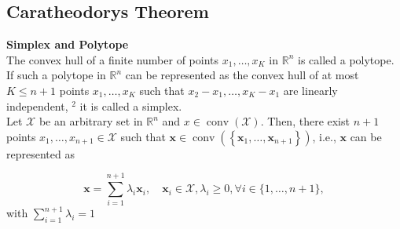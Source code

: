 \documentclass[english]{latex4ei_sheet}
\begin{document}
\begin{sectionbox}
\subsection{Caratheodorys Theorem}

\textbf{Simplex and Polytope}\\
The convex hull of a finite number of points $x_{1}, \ldots, x_{K}$ in $\mathbb{R}^{n}$ is called a polytope. If such a polytope in $\mathbb{R}^{n}$ can be represented as the convex hull of at most $K \leq n+1$ points $x_{1}, \ldots, x_{K}$ such that $x_{2}-x_{1}, \ldots, x_{K}-x_{1}$ are linearly independent, $^{2}$ it is called a simplex.\\

Let $\mathcal{X}$ be an arbitrary set in $\mathbb{R}^{n}$ and $x \in \operatorname{conv}(\mathcal{X})$. Then, there exist $n+1$ points $x_{1}, \ldots, x_{n+1} \in \mathcal{X}$ such that $\boldsymbol{x} \in \operatorname{conv}\left(\left\{\boldsymbol{x}_{1}, \ldots, \boldsymbol{x}_{n+1}\right\}\right)$, i.e., $\boldsymbol{x}$ can be represented as
\begin{emphbox}
$$
\boldsymbol{x}=\sum_{i=1}^{n+1} \lambda_{i} \boldsymbol{x}_{i}, \quad \boldsymbol{x}_{i} \in \mathcal{X}, \lambda_{i} \geq 0, \forall i \in\{1, \ldots, n+1\},
$$
with
$
\sum_{i=1}^{n+1} \lambda_{i}=1
$
\end{emphbox}
\end{sectionbox}
\end{document}
